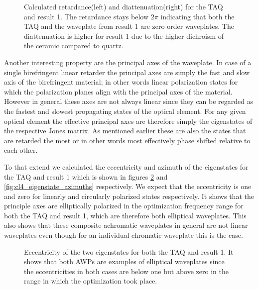 \begin{figure}[H]
    \centering
    
    \caption{Calculated retardance(left) and diattenuation(right) for the TAQ and result 1. The retardance stays below $2\pi$ indicating that both the TAQ and the waveplate from result 1 are zero order waveplates. The diattenuation is higher for result 1 due to the higher dichroism of the  ceramic compared to quartz.}%
    \label{fig:cl4_ret_diat}
\end{figure}

Another interesting property are the principal axes of the waveplate. In case of a single birefringent linear retarder the principal axes are simply the fast and slow axis of the birefringent material; in other words linear polarization states for which the polarization planes align with the principal axes of the material. However in general these axes are not always linear since they can be regarded as the fastest and slowest propagating states of the optical element. For any given optical element the effective principal axes are therefore simply the eigenstates of the respective Jones matrix. As mentioned earlier these are also the states that are retarded the most or in other words most effectively phase shifted relative to each other. 

To that extend we calculated the eccentricity and azimuth of the eigenstates for the TAQ and result 1 which is shown in figures \ref{fig:cl4_eigenstate_eccentricity} and \ref{fig:cl4_eigenstate_azimuths} respectively. We expect that the eccentricity is one and zero for linearly and circularly polarized states respectively. It shows that the principle axes are elliptically polarized in the optimization frequency range for both the TAQ and result 1, which are therefore both elliptical waveplates. This also shows that these composite achromatic waveplates in general are not linear waveplates even though for an individual chromatic waveplate this is the case.

\begin{figure}[H]
    \centering
    
    \caption{Eccentricity of the two eigenstates for both the TAQ and result 1. It shows that both AWPs are examples of elliptical waveplates since the eccentricities in both cases are below one but above zero in the range in which the optimization took place.}
    \label{fig:cl4_eigenstate_eccentricity}
\end{figure}

